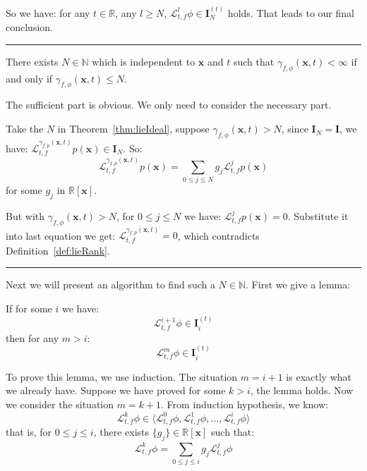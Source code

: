 \documentclass{jssc}
\newcommand{\rulex}{\hfill\rule{1mm}{3mm}}
\begin{document}
So we have: for any $t \in \mathbb{R}$, any $l \geq N$, $\mathcal{L}_{t, f}^l \phi  \in \boldsymbol{I}_N^{(t)}$ holds. That leads to our final conclusion.
\rulex

\begin{corollary}
\label{cor:lieRank}
There exists $N \in \mathbb{N}$ which is independent to $\boldsymbol{x}$ and $t$ such that $\gamma_{f, \phi}(\boldsymbol{x}, t) < \infty$ if and only if $\gamma_{f, \phi}(\boldsymbol{x}, t) \leq N$.
\end{corollary}
\proof
The sufficient part is obvious. We only need to consider the necessary part.

Take the $N$ in Theorem~\ref{thm:lieIdeal}, suppose $\gamma_{f, \phi}(\boldsymbol{x}, t) > N$, since $\boldsymbol{I}_N = \boldsymbol{I}$, we have:  $\mathcal{L}_{t, f}^{\gamma_{f, p}(\boldsymbol{x}, t)} p(\boldsymbol{x}) \in \boldsymbol{I}_N$. So:
\begin{equation*}
	 \mathcal{L}_{t, f}^{\gamma_{f, p}(\boldsymbol{x}, t)} p(\boldsymbol{x}) = \sum_{0 \leq j \leq N} g_j \mathcal{L}_{t, f}^j p(\boldsymbol{x})
\end{equation*}
for some $g_j$ in $\mathbb{R}[\boldsymbol{x}]$.

But with $\gamma_{f, \phi}(\boldsymbol{x}, t) > N$, for $0 \leq j \leq N$ we have: $\mathcal{L}_{t, f}^j p(\boldsymbol{x}) = 0$. Substitute it into last equation we get:  $\mathcal{L}_{t, f}^{\gamma_{f, p}(\boldsymbol{x}, t)} = 0$, which contradicts Definition~\ref{def:lieRank}.
\rulex

Next we will present an algorithm to find such a $N \in \mathbb{N}$. First we give a lemma:
\begin{lemma}
\label{lem:fixed}
If for some $i$ we have:
	\begin{equation*}
		\mathcal{L}_{t, f}^{i+1} \phi \in \boldsymbol{I}_i^{(t)}
	\end{equation*}
	then for any $m>i$:
	\begin{equation*}
		\mathcal{L}_{t, f}^{m} \phi \in \boldsymbol{I}_i^{(t)}
	\end{equation*}
\end{lemma}

\proof
To prove this lemma, we use induction. The situation $m = i+1$ is exactly what we already have. Suppose we have proved for some $k > i$, the lemma holds. Now we consider the situation $m = k+1$. From induction hypothesis, we know:
		\begin{equation*}
			\mathcal{L}_{t, f}^k \phi \in \langle \mathcal{L}_{t, f}^0 \phi, \mathcal{L}_{t, f}^1 \phi, \dots, \mathcal{L}_{t, f}^i \phi \rangle
		\end{equation*}
that is, for $0 \leq j \leq i$, there exists $\{ g_j \} \in \mathbb{R} [\boldsymbol{x}]$ such that:
		\begin{equation*}
			\mathcal{L}_{t, f}^k \phi = \sum_{0 \leq j \leq i} g_j \mathcal{L}_{t, f}^j \phi
		\end{equation*}
\end{document}

